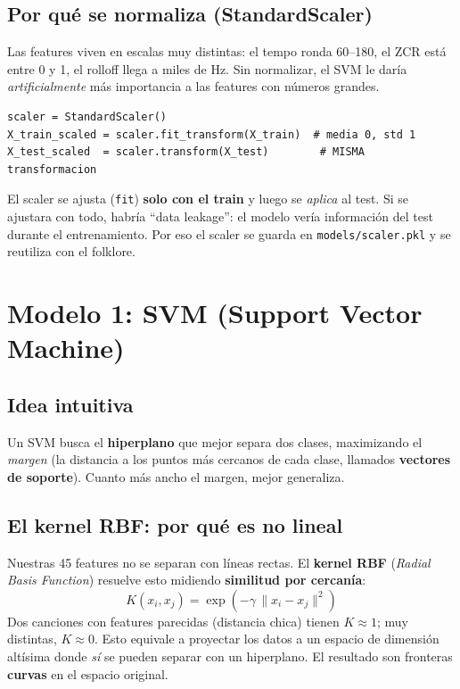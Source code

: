 \documentclass[11pt,a4paper]{article}
\newenvironment{defenbox}[1]{\begin{mdframed}[style=defenstyle,frametitle={#1}]}{\end{mdframed}}
\begin{document}
\subsection{Por qué se normaliza (StandardScaler)}

Las features viven en escalas muy distintas: el tempo ronda 60--180, el ZCR está
entre 0 y 1, el rolloff llega a miles de Hz. Sin normalizar, el SVM le daría
\emph{artificialmente} más importancia a las features con números grandes.

\begin{lstlisting}
scaler = StandardScaler()
X_train_scaled = scaler.fit_transform(X_train)  # media 0, std 1
X_test_scaled  = scaler.transform(X_test)        # MISMA transformacion
\end{lstlisting}

\begin{defenbox}{Detalle importante}
El scaler se ajusta (\texttt{fit}) \textbf{solo con el train} y luego se
\emph{aplica} al test. Si se ajustara con todo, habría ``data leakage'': el
modelo vería información del test durante el entrenamiento. Por eso el scaler se
guarda en \texttt{models/scaler.pkl} y se reutiliza con el folklore.
\end{defenbox}

\section{Modelo 1: SVM (Support Vector Machine)}

\subsection{Idea intuitiva}

Un SVM busca el \textbf{hiperplano} que mejor separa dos clases, maximizando el
\emph{margen} (la distancia a los puntos más cercanos de cada clase, llamados
\textbf{vectores de soporte}). Cuanto más ancho el margen, mejor generaliza.

\subsection{El kernel RBF: por qué es no lineal}

Nuestras 45 features no se separan con líneas rectas. El \textbf{kernel RBF}
(\emph{Radial Basis Function}) resuelve esto midiendo \textbf{similitud por
cercanía}:
\[
K(x_i, x_j) = \exp\!\left(-\gamma \, \lVert x_i - x_j \rVert^2\right)
\]
Dos canciones con features parecidas (distancia chica) tienen $K \approx 1$; muy
distintas, $K \approx 0$. Esto equivale a proyectar los datos a un espacio de
dimensión altísima donde \emph{sí} se pueden separar con un hiperplano. El
resultado son fronteras \textbf{curvas} en el espacio original.
\end{document}
